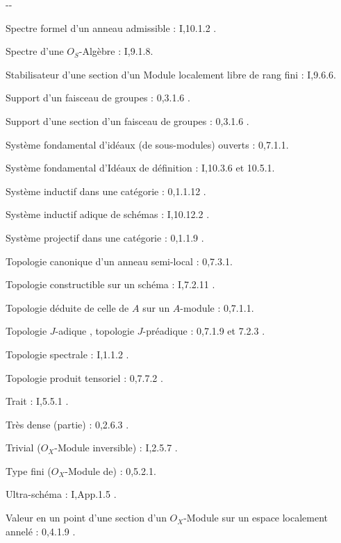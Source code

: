 \begin{center}-\qquad -\end{center}

Spectre formel d'un anneau admissible : I,10.1.2 .

Spectre d'une $O_S$-Algèbre : I,9.1.8.

Stabilisateur d'une section d'un Module localement libre de rang fini : I,9.6.6.

Support d'un faisceau de groupes :  0,3.1.6 .

Support d'une section d'un faisceau de groupes : 0,3.1.6 .

Système fondamental d'idéaux (de sous-modules) ouverts : 0,7.1.1.

Système fondamental d'Idéaux de définition : I,10.3.6 et 10.5.1.

Système inductif dans une catégorie : 0,1.1.12 .

Système inductif adique de schémas : I,10.12.2 .

Système projectif dans une catégorie : 0,1.1.9 .

Topologie canonique d'un anneau semi-local : 0,7.3.1.

Topologie constructible sur un schéma :  I,7.2.11 .

Topologie déduite de celle de $A$ sur un $A$-module : 0,7.1.1.

Topologie $J$-adique , topologie $J$-préadique : 0,7.1.9 et 7.2.3 .

Topologie spectrale : I,1.1.2 .

Topologie produit tensoriel : 0,7.7.2 .

Trait : I,5.5.1 .

Très dense (partie) : 0,2.6.3 .

Trivial ($O_X$-Module inversible) : I,2.5.7 .

Type fini ($O_X$-Module de) : 0,5.2.1.

Ultra-schéma : I,App.1.5 .

Valeur en un point d'une section d'un $O_X$-Module sur un espace localement annelé : 0,4.1.9 .
